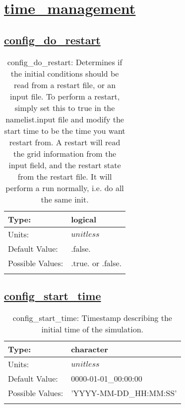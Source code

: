 \section[time\_management]{\hyperref[sec:nm_tab_time_management]{time\_management}}
\label{sec:nm_sec_time_management}
\subsection[config\_do\_restart]{\hyperref[sec:nm_tab_time_management]{config\_do\_restart}}
\label{subsec:nm_sec_config_do_restart}
\begin{center}
\begin{longtable}{| p{2.0in} | p{4.0in} |}
    \hline
    Type: & logical \\
    \hline
    Units: & $unitless$ \\
    \hline
    Default Value: & .false. \\
    \hline
    Possible Values: & .true. or .false. \\
    \hline
    \caption{config\_do\_restart: Determines if the initial conditions should be read from a restart file, or an input file.  To perform a restart, simply set this to true in the namelist.input file and modify the start time to be the time you want restart from.  A restart will read the grid information from the input field, and the restart state from the restart file.  It will perform a run normally, i.e. do all the same init.}
\end{longtable}
\end{center}
\subsection[config\_start\_time]{\hyperref[sec:nm_tab_time_management]{config\_start\_time}}
\label{subsec:nm_sec_config_start_time}
\begin{center}
\begin{longtable}{| p{2.0in} | p{4.0in} |}
    \hline
    Type: & character \\
    \hline
    Units: & $unitless$ \\
    \hline
    Default Value: & 0000-01-01\_00:00:00 \\
    \hline
    Possible Values: & 'YYYY-MM-DD\_HH:MM:SS' \\
    \hline
    \caption{config\_start\_time: Timestamp describing the initial time of the simulation.}
\end{longtable}
\end{center}
